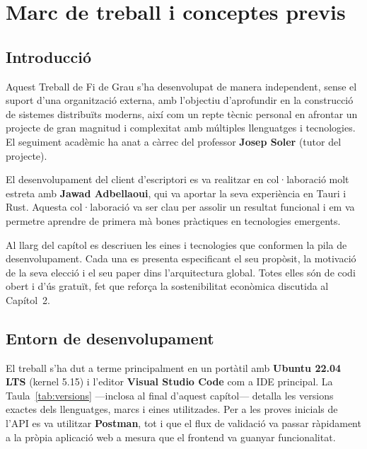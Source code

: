 

\chapter{Marc de treball i conceptes previs}

\section{Introducció}

Aquest Treball de Fi de Grau s'ha desenvolupat de manera independent, sense el suport d'una organització externa, amb l'objectiu d'aprofundir en la construcció de sistemes distribuïts moderns, així com un repte tècnic personal en afrontar un projecte de gran magnitud i complexitat amb múltiples llenguatges i tecnologies. El seguiment acadèmic ha anat a càrrec del professor \textbf{Josep Soler} (tutor del projecte).

El desenvolupament del client d'escriptori es va realitzar en col·laboració molt estreta amb \textbf{Jawad Adbellaoui}, qui va aportar la seva experiència en Tauri i Rust. Aquesta col·laboració va ser clau per assolir un resultat funcional i em va permetre aprendre de primera mà bones pràctiques en tecnologies emergents.

Al llarg del capítol es descriuen les eines i tecnologies que conformen la pila de desenvolupament. Cada una es presenta especificant el seu propòsit, la motivació de la seva elecció i el seu paper dins l'arquitectura global. Totes elles són de codi obert i d'ús gratuït, fet que reforça la sostenibilitat econòmica discutida al Capítol~2.

\section{Entorn de desenvolupament}

El treball s'ha dut a terme principalment en un portàtil amb \textbf{Ubuntu 22.04 LTS} (kernel 5.15) i l'editor \textbf{Visual Studio Code} com a IDE principal. La Taula~\ref{tab:versions} —inclosa al final d'aquest capítol— detalla les versions exactes dels llenguatges, marcs i eines utilitzades. Per a les proves inicials de l'API es va utilitzar \textbf{Postman}, tot i que el flux de validació va passar ràpidament a la pròpia aplicació web a mesura que el frontend va guanyar funcionalitat.

